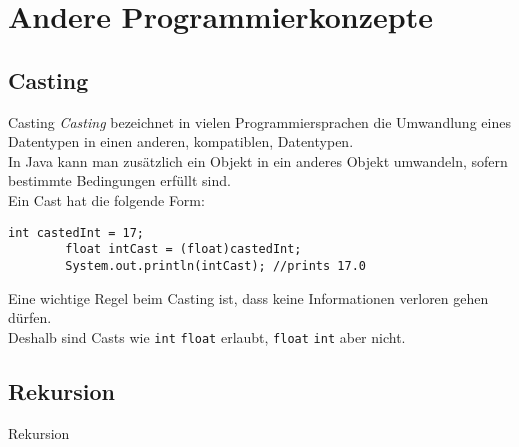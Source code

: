 \section{Andere Programmierkonzepte}
\subsection{Casting}

\begin{frame}[fragile]{Casting}
    \onslide<+->
    \textit{Casting} bezeichnet in vielen Programmiersprachen die Umwandlung eines Datentypen in einen anderen, kompatiblen, Datentypen.\\
    In Java kann man zusätzlich ein Objekt in ein anderes Objekt umwandeln, sofern bestimmte Bedingungen erfüllt sind.\footnotemark\\
    \onslide<+->
    Ein Cast hat die folgende Form:
    \begin{lstlisting}[basicstyle=\ttfamily\scriptsize,gobble=8]
        int castedInt = 17;
        float intCast = (float)castedInt;
        System.out.println(intCast); //prints 17.0
    \end{lstlisting}
    \onslide<+->
    Eine wichtige Regel beim Casting ist, dass keine Informationen verloren gehen dürfen.\\
    Deshalb sind Casts wie \texttt{int} \textrightarrow \texttt{float} erlaubt, \texttt{float} \textrightarrow \texttt{int} aber nicht.
\end{frame}

\subsection{Rekursion}

\begin{frame}{Rekursion}
    \begin{columns}[c]
        \begin{column}{.5\textwidth}
            \medskip
        \end{column}
        \begin{column}{.5\textwidth}
        \end{column}
    \end{columns}
\end{frame}

